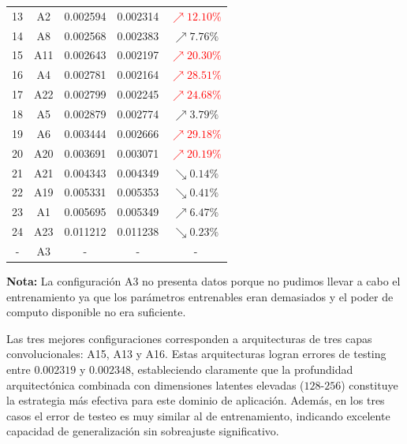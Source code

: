 \begin{table}[htbp]
\begin{tabular}{|c|c|c|c|c|}
13 & A2 & 0.002594 & 0.002314 & \textcolor{red}{$\nearrow 12.10\%$} \\
14 & A8 & 0.002568 & 0.002383 & \textcolor{rojito}{$\nearrow 7.76\%$} \\
15 & A11 & 0.002643 & 0.002197 & \textcolor{red}{$\nearrow 20.30\%$} \\
16 & A4 & 0.002781 & 0.002164 & \textcolor{red}{$\nearrow 28.51\%$} \\
17 & A22 & 0.002799 & 0.002245 & \textcolor{red}{$\nearrow 24.68\%$} \\
18 & A5 & 0.002879 & 0.002774 & \textcolor{rojito}{$\nearrow 3.79\%$} \\
19 & A6 & 0.003444 & 0.002666 & \textcolor{red}{$\nearrow 29.18\%$} \\
20 & A20 & 0.003691 & 0.003071 & \textcolor{red}{$\nearrow 20.19\%$} \\
21 & A21 & 0.004343 & 0.004349 & \textcolor{verdecito}{$\searrow 0.14\%$} \\
22 & A19 & 0.005331 & 0.005353 & \textcolor{verdecito}{$\searrow 0.41\%$} \\
23 & A1 & 0.005695 & 0.005349 & \textcolor{rojito}{$\nearrow 6.47\%$} \\
24 & A23 & 0.011212 & 0.011238 & \textcolor{verdecito}{$\searrow 0.23\%$} \\
\hline
- & A3 & - & - & - \\
\hline
\end{tabular}

\vspace{0.5cm}

\begin{flushleft}
\footnotesize
\textbf{Nota:}
La configuración A3 no presenta datos porque no pudimos llevar a cabo el entrenamiento ya que los parámetros entrenables eran demasiados y el poder de computo disponible no era suficiente.
\end{flushleft}
\end{table}


Las tres mejores configuraciones corresponden a arquitecturas de tres capas convolucionales: A15, A13 y A16. Estas arquitecturas logran errores de testing entre $0.002319$ y $0.002348$, estableciendo claramente que la profundidad arquitectónica combinada con dimensiones latentes elevadas ($128$-$256$) constituye la estrategia más efectiva para este dominio de aplicación. Además, en los tres casos el error de testeo es muy similar al de entrenamiento, indicando excelente capacidad de generalización sin sobreajuste significativo.

